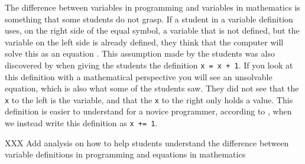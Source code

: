 The difference between variables in programming and variables in mathematics is something that some students do not grasp. If a student in a variable 
definition uses, on the right side of the equal symbol, a variable that is not 
defined, but the variable on the left side is already defined, they think that 
the computer will solve this as an equation \parencite{Plass2015Variables}. 
This assumption made by the students was also discovered by 
\textcite{Kohn2017VariableEvaluation} when giving the students the definition 
\verb'x = x + 1'. If you look at this definition with a mathematical 
perspective you will see an unsolvable equation, which is also what some of the 
students saw. They did not see that the \verb'x' to the left is the variable, 
and that the \verb'x' to the right only holds a value. This definition is  
easier to understand for a novice programmer, according to 
\textcite{Kohn2017VariableEvaluation}, when we instead write this definition as 
\verb'x += 1'. 

XXX Add analysis on how to help students understand the difference between variable definitions in programming and equations in mathematics

